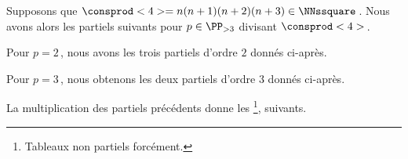 Supposons que $\consprod<4> = n(n+1)(n+2)(n+3) \in \NNssquare$\,. Nous avons alors les \sftab[x] partiels suivants pour $p \in \PP_{>3}$ divisant $\consprod<4>$\,.

\begin{center}
\end{center}


Pour $p = 2$\,, nous avons les trois \sftab[x] partiels d'ordre $2$ donnés ci-après.

\begin{center}
\end{center}


Pour $p = 3$\,, nous obtenons les deux \sftab[x] partiels d'ordre $3$ donnés ci-après.

\begin{center}
\end{center}


La multiplication des \sftab[x] partiels précédents donne les \sftab[x]
\footnote{
	Tableaux non partiels forcément.
},
suivants.

